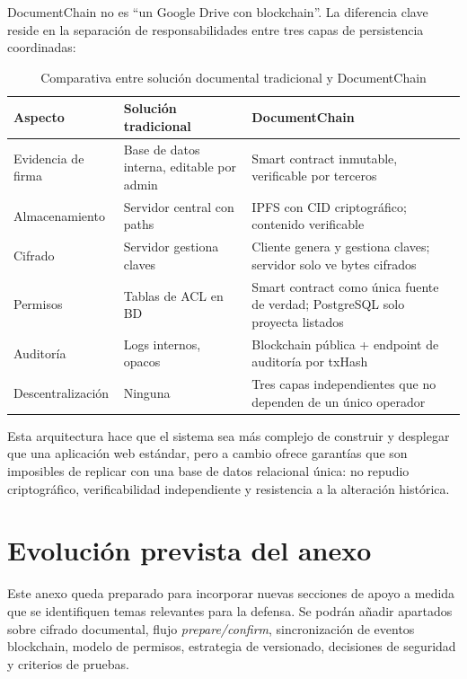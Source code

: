\documentclass[11pt, a4paper]{article}
\begin{document}
DocumentChain no es ``un Google Drive con blockchain''. La diferencia clave reside en la separaci\'on de responsabilidades entre tres capas de persistencia coordinadas:

\begin{table}[H]
    \centering
    \small
    \begin{tabular}{|p{3.5cm}|p{5cm}|p{5cm}|}
    \hline
    \textbf{Aspecto} & \textbf{Soluci\'on tradicional} & \textbf{DocumentChain} \\
    \hline
    Evidencia de firma & Base de datos interna, editable por admin & Smart contract inmutable, verificable por terceros \\
    \hline
    Almacenamiento & Servidor central con paths & IPFS con CID criptogr\'afico; contenido verificable \\
    \hline
    Cifrado & Servidor gestiona claves & Cliente genera y gestiona claves; servidor solo ve bytes cifrados \\
    \hline
    Permisos & Tablas de ACL en BD & Smart contract como única fuente de verdad; PostgreSQL solo proyecta listados \\
    \hline
    Auditor\'ia & Logs internos, opacos & Blockchain p\'ublica + endpoint de auditor\'ia por txHash \\
    \hline
    Descentralizaci\'on & Ninguna & Tres capas independientes que no dependen de un \'unico operador \\
    \hline
    \end{tabular}
    \caption{Comparativa entre soluci\'on documental tradicional y DocumentChain}
    \label{tab:diferencial}
\end{table}

Esta arquitectura hace que el sistema sea m\'as complejo de construir y desplegar que una aplicaci\'on web est\'andar, pero a cambio ofrece garant\'ias que son imposibles de replicar con una base de datos relacional \'unica: no repudio criptogr\'afico, verificabilidad independiente y resistencia a la alteraci\'on hist\'orica.

\section{Evolución prevista del anexo}

Este anexo queda preparado para incorporar nuevas secciones de apoyo a medida que se identifiquen temas relevantes para la defensa. Se podrán añadir apartados sobre cifrado documental, flujo \textit{prepare/confirm}, sincronización de eventos blockchain, modelo de permisos, estrategia de versionado, decisiones de seguridad y criterios de pruebas.
\end{document}
